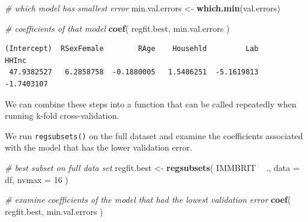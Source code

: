\documentclass[]{article}
\newenvironment{Shaded}{\begin{snugshade}}{\end{snugshade}}
\newcommand{\CommentTok}[1]{\textcolor[rgb]{0.56,0.35,0.01}{\textit{#1}}}
\newcommand{\ControlFlowTok}[1]{\textcolor[rgb]{0.13,0.29,0.53}{\textbf{#1}}}
\newcommand{\DataTypeTok}[1]{\textcolor[rgb]{0.13,0.29,0.53}{#1}}
\newcommand{\DecValTok}[1]{\textcolor[rgb]{0.00,0.00,0.81}{#1}}
\newcommand{\KeywordTok}[1]{\textcolor[rgb]{0.13,0.29,0.53}{\textbf{#1}}}
\newcommand{\NormalTok}[1]{#1}
\newcommand{\OperatorTok}[1]{\textcolor[rgb]{0.81,0.36,0.00}{\textbf{#1}}}
\newcommand{\StringTok}[1]{\textcolor[rgb]{0.31,0.60,0.02}{#1}}
\begin{document}
\begin{Shaded}
\begin{Highlighting}[]
\CommentTok{# which model has smallest error}
\NormalTok{min.val.errors <-}\StringTok{ }\KeywordTok{which.min}\NormalTok{(val.errors)}

\CommentTok{# coefficients of that model}
\KeywordTok{coef}\NormalTok{( regfit.best, min.val.errors )}
\end{Highlighting}
\end{Shaded}

\begin{verbatim}
(Intercept)  RSexFemale        RAge    Househld         Lab       HHInc 
 47.9382527   6.2858758  -0.1880005   1.5486251  -5.1619813  -1.7403107 
\end{verbatim}

We can combine these steps into a function that can be called repeatedly when running k-fold cross-validation.

\begin{Shaded}
\end{Shaded}

We run \texttt{regsubsets()} on the full dataset and examine the coefficients associated with the model that has the lower validation error.

\begin{Shaded}
\begin{Highlighting}[]
\CommentTok{# best subset on full data set}
\NormalTok{regfit.best <-}\StringTok{ }\KeywordTok{regsubsets}\NormalTok{( IMMBRIT }\OperatorTok{~}\StringTok{ }\NormalTok{., }\DataTypeTok{data =}\NormalTok{ df, }\DataTypeTok{nvmax =} \DecValTok{16}\NormalTok{ )}

\CommentTok{# examine coefficients of the model that had the lowest validation error}
\KeywordTok{coef}\NormalTok{( regfit.best, min.val.errors )}
\end{Highlighting}
\end{Shaded}
\end{document}
